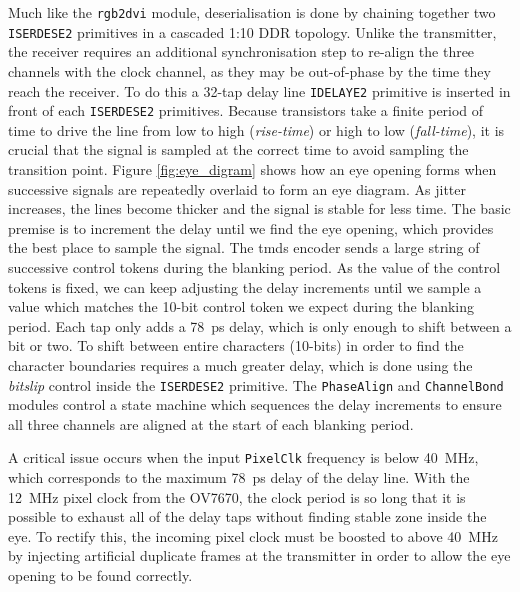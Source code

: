 Much like the \texttt{rgb2dvi} module, deserialisation is done by chaining together two \texttt{ISERDESE2} primitives in a cascaded 1:10 DDR topology. Unlike the transmitter, the receiver requires an additional synchronisation step to re-align the three channels with the clock channel, as they may be out-of-phase by the time they reach the receiver. To do this a 32-tap delay line \texttt{IDELAYE2} primitive is inserted in front of each \texttt{ISERDESE2} primitives. Because transistors take a finite period of time to drive the line from low to high (\textit{rise-time}) or high to low (\textit{fall-time}), it is crucial that the signal is sampled at the correct time to avoid sampling the transition point. Figure \ref{fig:eye_digram} shows how an eye opening forms when successive signals are repeatedly overlaid to form an eye diagram. As jitter increases, the lines become thicker and the signal is stable for less time. The basic premise is to increment the delay until we find the eye opening, which provides the best place to sample the signal. The \gls{tmds} encoder sends a large string of successive control tokens during the blanking period. As the value of the control tokens is fixed, we can keep adjusting the delay increments until we sample a value which matches the 10-bit control token we expect during the blanking period. Each tap only adds a \SI{78}{\pico\second} delay, which is only enough to shift between a bit or two. To shift between entire characters (10-bits) in order to find the character boundaries requires a much greater delay, which is done using the \textit{bitslip} control inside the \texttt{ISERDESE2} primitive. The \texttt{PhaseAlign} and \texttt{ChannelBond} modules control a state machine which sequences the delay increments to ensure all three channels are aligned at the start of each blanking period.

A critical issue occurs when the input \texttt{PixelClk} frequency is below \SI{40}{\mega\hertz}, which corresponds to the maximum \SI{78}{\pico\second} delay of the delay line. With the \SI{12}{\mega\hertz} pixel clock from the OV7670, the clock period is so long that it is possible to exhaust all of the delay taps without finding stable zone inside the eye. To rectify this, the incoming pixel clock must be boosted to above \SI{40}{\mega\hertz} by injecting artificial duplicate frames at the transmitter in order to allow the eye opening to be found correctly.


